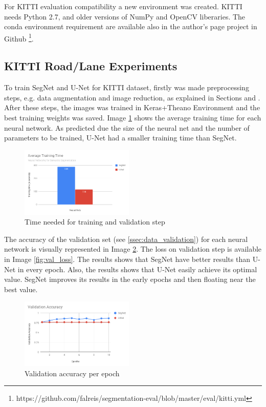 \documentclass[10pt,twocolumn,letterpaper]{article}
\begin{document}
For KITTI evaluation compatibility a new environment was created. KITTI needs Python 2.7, and older versions of NumPy and OpenCV liberaries. The conda environment requirement are available also in the author's page project in Github \footnote{https://github.com/falreis/segmentation-eval/blob/master/eval/kitti.yml}.

\subsection{KITTI Road/Lane Experiments} \label{ssec:kitti_experiments}

To train SegNet and U-Net for KITTI dataset, firstly was made preprocessing steps, e.g. data augmentation and image reduction, as explained in Sections \label{ssec:data_augmentation} and \label{ssec:image_reduction}. After these steps, the images was trained in Keras+Theano Environment and the best training weights was saved. Image \ref{fig:training_time} shows the average training time for each neural network. As predicted due the size of the neural net and the number of parameters to be trained, U-Net had a smaller training time than SegNet.

\begin{figure}[ht]
  \centering
  \includegraphics[width=0.48\textwidth]{graph_training_time.png}
  \caption{Time needed for training and validation step}
  \label{fig:training_time}
\end{figure}

The accuracy of the validation set (see \ref{ssec:data_validation}) for each neural network is visually represented in Image \ref{fig:val_acc}. The loss on validation step is available in Image \ref{fig:val_loss}. The results shows that SegNet have better results than U-Net in every epoch. Also, the results shows that U-Net easily achieve its optimal value. SegNet improves its results in the early epochs and then floating near the best value.

\begin{figure}[ht]
  \centering
  \includegraphics[width=0.48\textwidth]{graph_val_acc.png}
  \caption{Validation accuracy per epoch}
  \label{fig:val_acc}
\end{figure}
\end{document}
